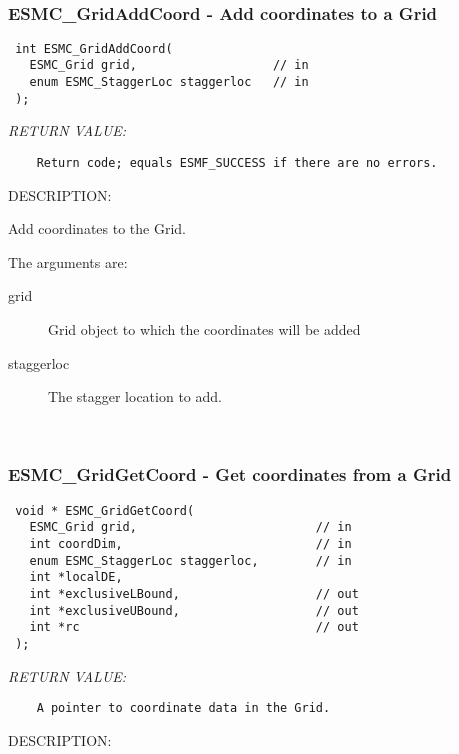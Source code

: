  
\mbox{}\hrulefill\ 
 
\subsubsection [ESMC\_GridAddCoord] {ESMC\_GridAddCoord - Add coordinates to a Grid}


  
\begin{verbatim} int ESMC_GridAddCoord(
   ESMC_Grid grid,                   // in
   enum ESMC_StaggerLoc staggerloc   // in
 );
 \end{verbatim}{\em RETURN VALUE:}
\begin{verbatim}    Return code; equals ESMF_SUCCESS if there are no errors.\end{verbatim}
{\sf DESCRIPTION:\\ }


    Add coordinates to the Grid.
  
    The arguments are:
    \begin{description}
    \item[grid]
      Grid object to which the coordinates will be added
    \item[staggerloc]
      The stagger location to add.
    \end{description}
   
 
\mbox{}\hrulefill\ 
 
\subsubsection [ESMC\_GridGetCoord] {ESMC\_GridGetCoord - Get coordinates from a Grid}


  
\begin{verbatim} void * ESMC_GridGetCoord(
   ESMC_Grid grid,                         // in
   int coordDim,                           // in
   enum ESMC_StaggerLoc staggerloc,        // in
   int *localDE,
   int *exclusiveLBound,                   // out
   int *exclusiveUBound,                   // out
   int *rc                                 // out
 );
 \end{verbatim}{\em RETURN VALUE:}
\begin{verbatim}    A pointer to coordinate data in the Grid. \end{verbatim}
{\sf DESCRIPTION:\\ }


